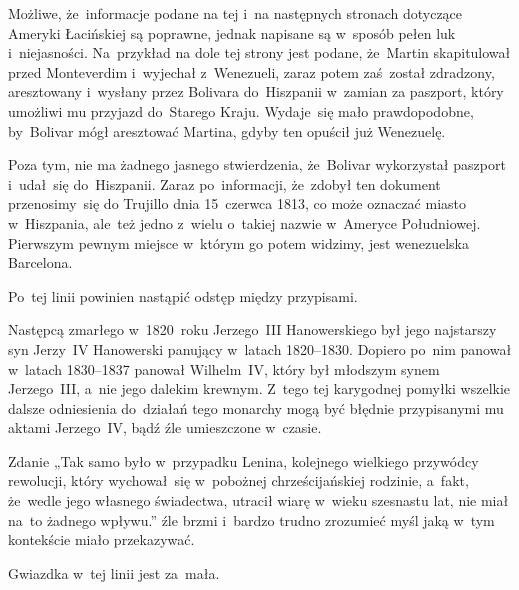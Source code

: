 \documentclass[a4paper,11pt]{article}
\begin{document}
\vspace{\spaceFour}


\start {} Możliwe, że~informacje podane na tej i~na następnych
stronach dotyczące Ameryki Łacińskiej są poprawne, jednak napisane są
w~sposób pełen luk i~niejasności. Na~przykład na dole tej strony jest
podane, że~Martin skapitulował przed Monteverdim i~wyjechał
z~Wenezueli, zaraz potem zaś~został zdradzony, aresztowany i~wysłany
przez Bolivara do~Hiszpanii w~zamian za paszport, który umożliwi mu
przyjazd do~Starego Kraju. Wydaje~się mało prawdopodobne, by~Bolivar
mógł aresztować Martina, gdyby ten opuścił już Wenezuelę.

Poza tym, nie ma żadnego jasnego stwierdzenia, że~Bolivar wykorzystał
paszport i~udał~się do~Hiszpanii. Zaraz po~informacji, że~zdobył ten
dokument przenosimy~się do Trujillo dnia 15~czerwca 1813, co może
oznaczać miasto w~Hiszpania, ale~też jedno z~wielu o~takiej nazwie
w~Ameryce Południowej. Pierwszym pewnym miejsce w~którym go potem
widzimy, jest wenezuelska Barcelona.

\vspace{\spaceFour}


\start {} Po~tej linii powinien nastąpić odstęp między
przypisami.

\vspace{\spaceFour}


\start {} Następcą zmarłego w~1820~roku Jerzego~III
Hanowerskiego był jego najstarszy syn Jerzy~IV Hanowerski panujący
w~latach 1820--1830. Dopiero po~nim panował w~latach 1830--1837 panował
Wilhelm~IV, który był młodszym synem Jerzego~III, a~nie jego dalekim
krewnym. Z~tego tej karygodnej pomyłki wszelkie dalsze odniesienia
do~działań tego monarchy mogą być błędnie przypisanymi mu aktami
Jerzego~IV, bądź źle umieszczone w~czasie.

\vspace{\spaceFour}


\start {} Zdanie „Tak samo było w~przypadku Lenina,
kolejnego wielkiego przywódcy rewolucji, który wychował~się w~pobożnej
chrześcijańskiej rodzinie, a~fakt, że~wedle jego własnego świadectwa,
utracił wiarę w~wieku szesnastu lat, nie miał na~to żadnego wpływu.”
źle brzmi i~bardzo trudno zrozumieć myśl jaką w~tym kontekście miało
przekazywać.

\vspace{\spaceFour}


\start {} Gwiazdka w~tej linii jest za~mała.
\end{document}
